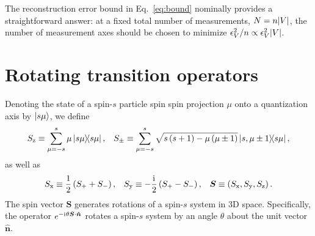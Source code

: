 \documentclass[notitlepage,twocolumn]{revtex4-2}
\newcommand{\f}[2]{\dfrac{#1}{#2}} %
\newcommand{\p}[1]{\left(#1\right)} %
\renewcommand{\v}{\bm} %
\newcommand{\uv}[1]{\bm{\hat{#1}}} %
\renewcommand{\i}{\mathrm{i}\mkern1mu} %
\newcommand{\x}{\text{x}}
\newcommand{\y}{\text{y}}
\newcommand{\z}{\text{z}}
\newcommand{\1}{\mathds{1}}
\begin{document}
The reconstruction error bound in Eq.~\eqref{eq:bound} nominally provides a straightforward answer: at a fixed total number of measurements, $N=n\abs{V}$, the number of measurement axes should be chosen to minimize $\epsilon_V^2/n\propto\epsilon_V^2\abs{V}$.






\onecolumngrid
\appendix

\section{Rotating transition operators}
\label{sec:rotations}

Denoting the state of a spin-$s$ particle spin spin projection $\mu$ onto a quantization axis by $\ket{s\mu}$, we define
\begin{align}
  S_\z \equiv \sum_{\mu=-s}^s \mu \op{s\mu},
  &&
  S_\pm \equiv \sum_{\mu=-s}^s
  \sqrt{s\p{s+1}-\mu\p{\mu\pm1}} \op{s,\mu\pm1}{s\mu},
  \label{eq:spin_ops}
\end{align}
as well as
\begin{align}
  S_\x \equiv \f12\p{S_+ + S_-},
  &&
  S_\y \equiv -\f\i2\p{S_+-S_-},
  &&
  \v S \equiv \p{S_\x,S_\y,S_\z}.
\end{align}
The spin vector $\v S$ generates rotations of a spin-$s$ system in 3D space.
Specifically, the operator $e^{-\i\theta\v S\cdot\uv n}$ rotates a spin-$s$ system by an angle $\theta$ about the unit vector $\uv n$.
\end{document}
